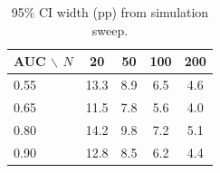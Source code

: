 \documentclass[11pt,a4paper]{article}
\begin{document}
\begin{table}[h]
\centering
\small
\caption{95\% CI width (pp) from simulation sweep.}
\begin{tabular}{@{}l cccc@{}}
\toprule
\textbf{AUC $\backslash$ $N$} & \textbf{20} & \textbf{50} & \textbf{100} & \textbf{200} \\
\midrule
0.55 & 13.3 & 8.9 & 6.5 & 4.6 \\
0.65 & 11.5 & 7.8 & 5.6 & 4.0 \\
0.80 & 14.2 & 9.8 & 7.2 & 5.1 \\
0.90 & 12.8 & 8.5 & 6.2 & 4.4 \\
\bottomrule
\end{tabular}
\end{table}
\end{document}
